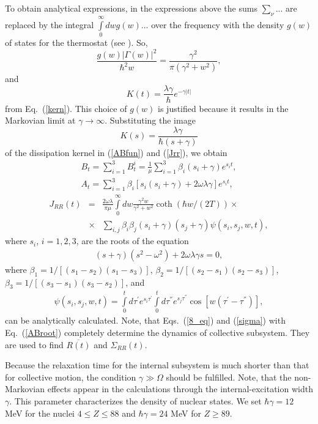 \documentclass[preprint,review,12pt]{elsarticle}
\begin{document}
  To obtain analytical expressions, in the expressions above the sums $\sum_{\nu}^{}...$ are replaced by the
  integral $\int\limits_{0}^{\infty} dw g(w)...$ over the frequency with the density $g(w)$ of states  for
  the thermostat (see \cite{Katia,VAZ}). So,
  $$\frac{g(w)|\Gamma (w)|^2}{\hbar^2w}= \frac{\gamma^2}{\pi (\gamma^2+w^2)},$$
  and
  $$K(t)=\frac{\lambda\gamma}{\hbar}e^{-\gamma|t|}$$
  from Eq.~(\ref{kern}). This choice of $g(w)$ is justified because it results in the Markovian limit at $\gamma\rightarrow\infty$.
  Substituting the image $$K(s)=\frac{\lambda\gamma}{\hbar (s+\gamma)}$$ of the dissipation kernel in (\ref{ABfun}) and (\ref{Jrr}), we obtain
  \begin{eqnarray}
  B_t=\sum_{i=1}^{3}B_t^i=\frac{1}{\mu}\sum_{i=1}^{3}\beta_i(s_i+\gamma)e^{s_it},\nonumber\\
  A_t=\sum_{i=1}^{3}\beta_i[s_i(s_i+\gamma)+2\omega\lambda\gamma]e^{s_it},
  \label{ABroot}
  \end{eqnarray}
   \begin{eqnarray}
  J_{RR}(t)&=&\frac{2\omega\lambda}{\pi\mu} \int\limits_{0}^{\infty} dw\frac{\gamma^2  w}{\gamma^2+w^2}\coth(\hbar w/(2T))\times \nonumber\\
&\times&  \sum_{i,j}\beta_i\beta_j(s_i+\gamma)(s_j+\gamma)\psi(s_i,s_j,w,t),
  \label{sigma}
  \end{eqnarray}
  where $s_i$, $i=1,2,3$, are the roots of the equation
  \begin{eqnarray}
  (s+\gamma)(s^2-\omega^2)+2\omega\lambda\gamma s=0,
  \label{roots2}
  \end{eqnarray}
  where  $\beta_1=1/[(s_1-s_2)(s_1-s_3)]$,  $\beta_2=1/[(s_2-s_1)(s_2-s_3)]$, $\beta_3=1/[(s_3-s_1)(s_3-s_2)]$,
  and
  \begin{eqnarray}
  \psi(s_i,s_j,w,t)=\int\limits_{0}^{t} d\tau^{'}e^{s_i \tau^{'}} \int\limits_{0}^{t} d\tau^{''}e^{s_j \tau^{''}}
  \cos[w (\tau^{'}-\tau^{''})],
  \label{expint}
  \end{eqnarray}
  can be analytically calculated.
  Note, that Eqs.~(\ref{8_eq}) and (\ref{sigma}) with Eq.~(\ref{ABroot}) completely determine the dynamics of collective subsystem. They are used to find $\overline{R(t)}$ and $\Sigma_{RR}(t)$.

  Because the relaxation time for the internal subsystem is much shorter than
  that for collective motion, the condition $\gamma\gg \Omega$ should be fulfilled.
  Note, that the non-Markovian effects appear in the calculations through the internal-excitation width $\gamma$.
  This parameter characterizes the density of nuclear states.
  We set $\hbar\gamma=12$ MeV for the nuclei $4\leq Z \leq 88$ and  $\hbar\gamma=24$ MeV for $Z\geq89$.
\end{document}
